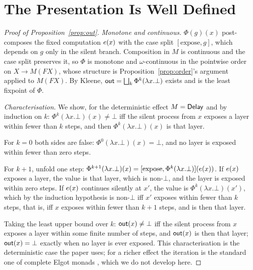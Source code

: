 \section{The Presentation Is Well Defined}\label{app:out}
\begin{proof}[Proof of Proposition~\ref{prop:out}]
  \emph{Monotone and continuous.} $\Phi(g)(x)$ post-composes the fixed computation
  $e(x)$ with the case split $[\text{expose}, g]$, which depends on $g$ only in the
  silent branch. Composition in $M$ is continuous and the case split preserves it, so $\Phi$
  is monotone and $\omega$-continuous in the pointwise order on $X \to M(F X)$, whose
  structure is Proposition~\ref{prop:order}'s argument applied to $M(F X)$. By Kleene,
  $\mathsf{out} = \bigsqcup_k \Phi^k(\lambda x.\bot)$ exists and is the least fixpoint of $\Phi$.

  \emph{Characterisation.} We show, for the deterministic effect $M = \mathsf{Delay}$ and by
  induction on $k$: $\Phi^k(\lambda x.\bot)(x) \neq \bot$ iff the silent process from $x$
  exposes a layer within fewer than $k$ steps, and then $\Phi^k(\lambda x.\bot)(x)$ is that
  layer.

  For $k = 0$ both sides are false: $\Phi^0(\lambda x.\bot)(x) = \bot$, and no layer is
  exposed within fewer than zero steps.

  For $k + 1$, unfold one step: $\Phi^{k+1}(\lambda x.\bot)(x) =
  [\text{expose}, \Phi^k(\lambda x.\bot)](e(x))$. If $e(x)$ exposes a layer, the
  value is that layer, which is non-$\bot$, and the layer is exposed within zero steps. If
  $e(x)$ continues silently at $x'$, the value is $\Phi^k(\lambda x.\bot)(x')$, which by
  the induction hypothesis is non-$\bot$ iff $x'$ exposes within fewer than $k$ steps, that
  is, iff $x$ exposes within fewer than $k + 1$ steps, and is then that layer.

  Taking the least upper bound over $k$: $\mathsf{out}(x) \neq \bot$ iff the silent process from $x$
  exposes a layer within some finite number of steps, and $\mathsf{out}(x)$ is then that layer;
  $\mathsf{out}(x) = \bot$ exactly when no layer is ever exposed. This characterisation is the
  deterministic case the paper uses; for a richer effect the iteration is the standard one of
  complete Elgot monads \cite{adamek2006-iterative-algebras, goncharov2016-complete-elgot-monads},
  which we do not develop here.
\end{proof}

